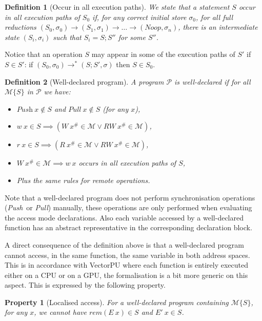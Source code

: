 \documentclass[preprint,12pt]{elsarticle}
\newcommand{\symb}[1]{\textit{#1}}
\newcommand{\noop}{\symb{Noop}}
\newcommand{\Push}{\symb{Push}}
\newcommand{\Pull}{\symb{Pull}}
\newcommand{\rem}[1]{\symb{rem}(#1)}
\newtheorem{definition}{Definition}
\newtheorem{Property}{Property}
\newcommand{\abs}[1]{#1^\#}
\newcommand{\AM}{\mathcal{M}}
\newcommand{\Prog}{\mathcal{P}}
\begin{document}
\begin{definition}[Occur in all execution paths]
We state that a statement\emph{ $S$ occur in all execution paths of $S_0$} if, for any 
correct 
initial store $\sigma_0$, for all full reductions 
$(S_0,\sigma_0)\to(S_1,\sigma_1)\to\ldots\to(\noop,\sigma_n)$, there is an intermediate 
state $(S_i,\sigma_i)$ such that $S_i=S;S''$ for some $S''$.
\end{definition}
Notice that an operation $S$ may appear in some of the execution paths of $S'$ if  $S\in 
S'$: if $(S_0,\sigma_0)\to^* (S;S',\sigma)$ then $S\in S_0$.


\begin{definition}[Well-declared program]\label{def-WD}
A program $\Prog$ is \emph{well-declared} if for all $\AM\{S\}$ in $\Prog$ we have:
\begin{itemize}
\item $\Push\ x\not\in S$ and $\Pull\ x\not \in S$ (for any $x$),
\item $w\ x\in S \implies (W\ \abs x \in \AM \lor RW\ \abs x \in \AM)$,
\item $r\ x\in S \implies (R\ \abs x \in \AM \lor RW\ \abs x \in \AM)$,
\item $W\ \abs x\!\in\! \AM \!\implies\! w\ x$ occurs in all execution paths of $S$,
\item Plus the same rules for remote operations.
\end{itemize}
\end{definition}
Note that a well-declared program does not perform synchronisation 
operations (\Push\ or \Pull) manually, these operations are only  performed when 
evaluating the 
access mode declarations. Also each variable accessed by a well-declared function has an 
abstract representative in the corresponding declaration block.


A direct consequence of the definition above is that a well-declared program cannot 
access, in the same function, the same
variable in both address spaces. This is in accordance with VectorPU where each function 
is entirely executed either on a CPU or on a GPU, the formalisation is a bit more 
 generic on this aspect. This is expressed by the following property.
\begin{Property}[Localised access]\label{prop-localised}
For a well-declared program containing $\AM\{S\}$, for any $x$, we cannot have $\rem {E\ 
x} \in S$ and $E'\ x \in S$.
\end{Property}

\smallskip
\end{document}
